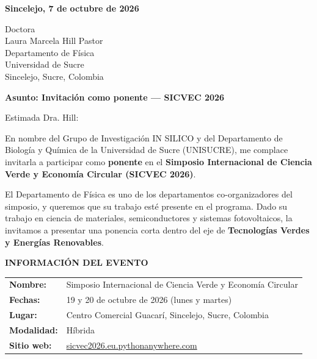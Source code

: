 \documentclass[11pt,a4paper]{article}
\begin{document}
\vspace{0.1cm}

\noindent
\textbf{Sincelejo, 7 de octubre de 2026}

\vspace{0.15cm}

\noindent
Doctora\\
Laura Marcela Hill Pastor\\
Departamento de Física\\
Universidad de Sucre\\
Sincelejo, Sucre, Colombia

\vspace{0.15cm}

\noindent
\textbf{\large Asunto: Invitación como ponente — SICVEC 2026}

\vspace{0.15cm}

Estimada Dra. Hill:

\vspace{0.1cm}

En nombre del Grupo de Investigación IN SILICO y del Departamento de Biología y Química de la Universidad de Sucre (UNISUCRE), me complace invitarla a participar como \textbf{ponente} en el \textbf{Simposio Internacional de Ciencia Verde y Economía Circular (SICVEC 2026)}.

El Departamento de Física es uno de los departamentos co-organizadores del simposio, y queremos que su trabajo esté presente en el programa. Dado su trabajo en ciencia de materiales, semiconductores y sistemas fotovoltaicos, la invitamos a presentar una ponencia corta dentro del eje de \textbf{Tecnologías Verdes y Energías Renovables}.

\vspace{0.1cm}

\noindent
\textbf{INFORMACIÓN DEL EVENTO}

\begin{tabular}{ll}
\textbf{Nombre:} & Simposio Internacional de Ciencia Verde y Economía Circular \\
\textbf{Fechas:} & 19 y 20 de octubre de 2026 (lunes y martes) \\
\textbf{Lugar:} & Centro Comercial Guacarí, Sincelejo, Sucre, Colombia \\
\textbf{Modalidad:} & Híbrida \\
\textbf{Sitio web:} & \href{https://sicvec2026.eu.pythonanywhere.com}{sicvec2026.eu.pythonanywhere.com} \\
\end{tabular}
\end{document}
